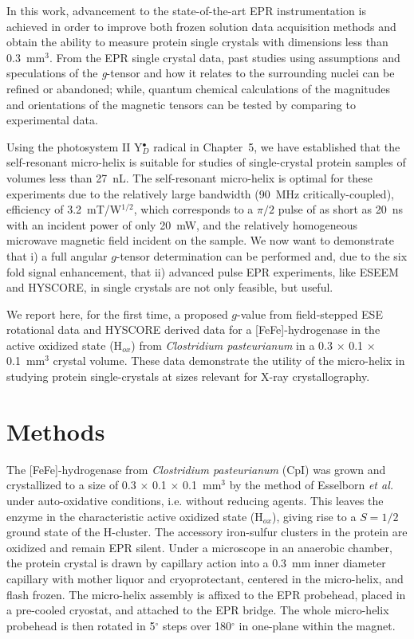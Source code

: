 In this work, advancement to the state-of-the-art EPR instrumentation is achieved in order to improve both frozen solution data acquisition methods and obtain the ability to measure protein single crystals with dimensions less than 0.3~mm$^3$. From the EPR single crystal data, past studies using assumptions and speculations of the \textit{g}-tensor and how it relates to the surrounding nuclei can be refined or abandoned; while, quantum chemical calculations of the magnitudes and orientations of the magnetic tensors can be tested by comparing to experimental data.

Using the photosystem II Y$_D^\bullet$ radical in Chapter~5, we have established that the self-resonant micro-helix is suitable for studies of single-crystal protein samples of volumes less than 27~nL. The self-resonant micro-helix is optimal for these experiments due to the relatively large bandwidth (90~MHz critically-coupled), efficiency of 3.2~mT/W$^{1/2}$, which corresponds to a $\pi/2$ pulse of as short as 20~ns with an incident power of only 20~mW, and the relatively homogeneous microwave magnetic field incident on the sample. We now want to demonstrate that i) a full angular $g$-tensor determination can be performed and, due to the six fold signal enhancement, that ii) advanced pulse EPR experiments, like ESEEM and HYSCORE, in single crystals are not only feasible, but useful. 

We report here, for the first time, a proposed $g$-value from field-stepped ESE rotational data and HYSCORE derived data for a [FeFe]-hydrogenase in the active oxidized state (H$_{ox}$) from {\em Clostridium pasteurianum} in a 0.3 $\times$ 0.1 $\times$ 0.1~mm$^3$ crystal volume. These data demonstrate the utility of the micro-helix in studying protein single-crystals at sizes relevant for X-ray crystallography.

\section{Methods}
The [FeFe]-hydrogenase from {\em Clostridium pasteurianum} (CpI) was grown and crystallized to a size of 0.3 $\times$ 0.1 $\times$ 0.1~mm$^3$ by the method of Esselborn {\em et al.}\cite{FeFeCry} under auto-oxidative conditions, i.e. without reducing agents. This leaves the enzyme in the characteristic active oxidized state (H$_{ox}$), giving rise to a $S=1/2$ ground state of the H-cluster. The accessory iron-sulfur clusters in the protein are oxidized and remain EPR silent. \cite{lubitzhyd}  Under a microscope in an anaerobic chamber, the protein crystal is drawn by capillary action into a 0.3~mm inner diameter capillary with mother liquor and cryoprotectant, centered in the micro-helix, and flash frozen. The micro-helix assembly is affixed to the EPR probehead, placed in a pre-cooled cryostat, and attached to the EPR bridge. The whole micro-helix probehead is then rotated in 5$^{\circ}$ steps over 180$^{\circ}$ in one-plane within the magnet. 

